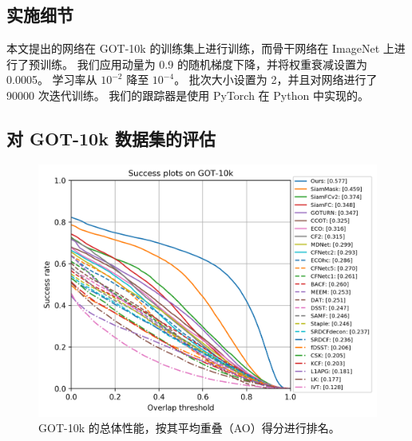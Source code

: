 \subsection{实施细节}
本文提出的网络在 GOT-10k \cite{GOT-10k} 的训练集上进行训练，而骨干网络在 ImageNet 上进行了预训练。
我们应用动量​​为 0.9 的随机梯度下降，并将权重衰减设置为 0.0005。
学习率从 $10^{-2}$ 降至 $10^{-4}$。
批次大小设置为 2，并且对网络进行了 90000 次迭代训练。
我们的跟踪器是使用 PyTorch 在 Python 中实现的。
\subsection{对 GOT-10k 数据集的评估}

\begin{figure}[t]
    \centering
    \includegraphics[width=1\textwidth]{Img/end/success_plot.png}
    \caption{GOT-10k 的总体性能，按其平均重叠（AO）得分进行排名。}
    \label{fig:got10k}
\end{figure}

